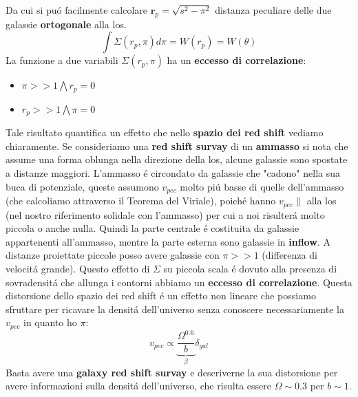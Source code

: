 \documentclass[12pt, a4paper]{article}
\begin{document}
Da cui si pu\'{o} facilmente calcolare $\mathbf{r}_p=\sqrt{s^2-\pi^2}$ distanza peculiare delle due galassie \textbf{ortogonale} alla los.
\begin{equation}
\int \Sigma(r_p, \pi) d\pi= W(r_p)=W(\theta)
\end{equation}
La funzione a due variabili $\Sigma(r_p, \pi)$ ha un \textbf{eccesso di correlazione}:
\begin{itemize}
\item $\pi>>1 \bigwedge r_p=0$
\item $r_p>>1 \bigwedge \pi=0$
\end{itemize}
Tale risultato quantifica un effetto che nello \textbf{spazio dei red shift} vediamo chiaramente. Se consideriamo una \textbf{red shift survay} di un \textbf{ammasso} si nota che assume una forma oblunga nella direzione della los, alcune galassie sono spostate a distanze maggiori. L'ammasso \'{e} circondato da galassie che "cadono" nella sua buca di potenziale, queste assumono $v_{pec}$ molto pi\'{u} basse di quelle dell'ammasso (che calcoliamo attraverso il Teorema del Viriale), poich\'{e} hanno $v_{pec}\parallel$ alla los (nel nostro riferimento solidale con l'ammasso) per cui a noi risulter\'{a} molto piccola o anche nulla. Quindi la parte centrale \'{e} costituita da galassie appartenenti all'ammasso, mentre la parte esterna sono galassie in \textbf{inflow}. A distanze proiettate piccole posso avere galassie con $\pi>>1$ (differenza di velocit\'{a} grande). Questo effetto di $\Sigma$ su piccola scala \'{e} dovuto alla presenza di sovradensit\'{a} che allunga i contorni abbiamo un \textbf{eccesso di correlazione}. Questa distorsione dello spazio dei red shift \'{e} un effetto non lineare che possiamo sfruttare per ricavare la densit\'{a} dell'universo senza conoscere necessariamente la $v_{pec}$ in quanto ho $\pi$:
\begin{equation}
v_{pec}\propto \underbrace{\frac{\Omega^{0.6}}{b}}_{\beta}\delta_{gal}
\end{equation}
Basta avere una \textbf{galaxy red shift survay} e descriverne la sua distorsione per avere informazioni sulla densit\'{a} dell'universo, che risulta essere $\Omega\sim 0.3$ per $b\sim 1$.
\end{document}

